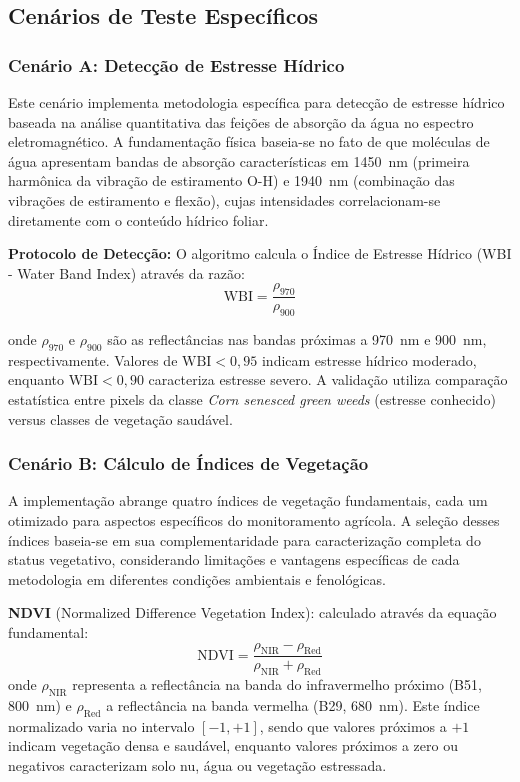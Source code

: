 \subsection{Cenários de Teste Específicos}\label{subsec:cenarios_teste}

\subsubsection{Cenário A: Detecção de Estresse Hídrico}

Este cenário implementa metodologia específica para detecção de estresse 
hídrico baseada na análise quantitativa das feições de absorção da água no 
espectro eletromagnético. A fundamentação física baseia-se no fato de que 
moléculas de água apresentam bandas de absorção características em 1450~nm 
(primeira harmônica da vibração de estiramento O-H) e 1940~nm (combinação 
das vibrações de estiramento e flexão), cujas intensidades correlacionam-se 
diretamente com o conteúdo hídrico foliar.

\textbf{Protocolo de Detecção:} O algoritmo calcula o Índice de Estresse 
Hídrico (WBI - Water Band Index) através da razão:
\begin{equation}
\text{WBI} = \frac{\rho_{970}}{\rho_{900}}
\label{eq:wbi}
\end{equation}

onde $\rho_{970}$ e $\rho_{900}$ são as reflectâncias nas bandas próximas 
a 970~nm e 900~nm, respectivamente. Valores de $\text{WBI} < 0{,}95$ indicam estresse 
hídrico moderado, enquanto $\text{WBI} < 0{,}90$ caracteriza estresse severo. A validação 
utiliza comparação estatística entre pixels da classe \textit{Corn senesced 
green weeds} (estresse conhecido) versus classes de vegetação saudável.

\subsubsection{Cenário B: Cálculo de Índices de Vegetação}

A implementação abrange quatro índices de vegetação fundamentais, cada um 
otimizado para aspectos específicos do monitoramento agrícola. A seleção 
desses índices baseia-se em sua complementaridade para caracterização completa 
do status vegetativo, considerando limitações e vantagens específicas de cada 
metodologia em diferentes condições ambientais e fenológicas.

\textbf{NDVI} (Normalized Difference Vegetation Index): calculado através da 
equação fundamental:
\begin{equation}
\text{NDVI} = \frac{\rho_{\text{NIR}} - \rho_{\text{Red}}}{\rho_{\text{NIR}} + \rho_{\text{Red}}}
\label{eq:ndvi}
\end{equation}
onde $\rho_{\text{NIR}}$ representa a reflectância na banda do infravermelho próximo 
(B51, 800~nm) e $\rho_{\text{Red}}$ a reflectância na banda vermelha (B29, 680~nm). 
Este índice normalizado varia no intervalo $[-1, +1]$, sendo que valores próximos 
a $+1$ indicam vegetação densa e saudável, enquanto valores próximos a zero 
ou negativos caracterizam solo nu, água ou vegetação estressada.

